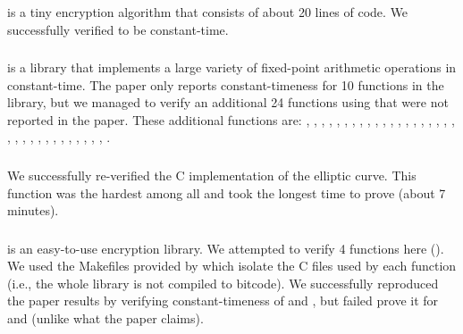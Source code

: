 \subsubsection{}
 is a tiny encryption algorithm that consists of about 20 lines
of code. We successfully verified  to be constant-time.

\subsubsection{} 
is a library that implements a large variety of fixed-point arithmetic
operations in constant-time. The paper only reports constant-timeness for 10
functions in the library, but we managed to verify an additional 24 functions using \ctVerif
that were not reported in the paper. These additional functions are:
,
,
,
,
,
,
,
,
,
,
,
,
,
,
,
,
,
,
,
,
,
,
,
,
,
,
,
,
,
,
,
,
,
.

\subsubsection{} We successfully re-verified the C
implementation of the  elliptic curve. This function
was the hardest among all and took the longest time to prove (about 7 minutes).


\subsubsection{}  is an easy-to-use
encryption library. We attempted to verify 4 functions here (). We used the Makefiles
provided by \ctVerif which isolate the C files used by each function (i.e., the
whole library is not compiled to  bitcode). We successfully
reproduced the paper results by verifying constant-timeness of
 and , but failed prove it for
 and  (unlike what the paper claims).


